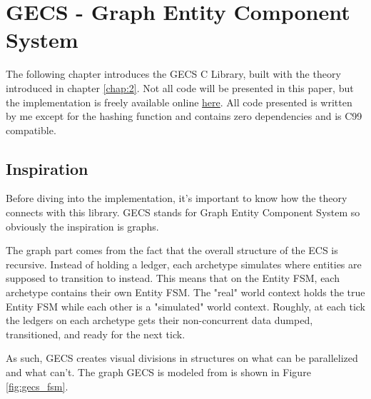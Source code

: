 \section{GECS - Graph Entity Component System}
\label{chap:3}

The following chapter introduces the GECS C Library, built with the theory introduced in chapter \ref{chap:2}. Not all code will be presented in this paper, but the implementation is freely available online \href{https://github.com/EmilChoparinov/GECS}{here}. All code presented is written by me except for the hashing function and contains zero dependencies and is C99 compatible.

\subsection{Inspiration}
Before diving into the implementation, it's important to know how the theory connects with this library. GECS stands for Graph Entity Component System so obviously the inspiration is graphs. 

The graph part comes from the fact that the overall structure of the ECS is recursive. Instead of holding a ledger, each archetype simulates where entities are supposed to transition to instead. This means that on the Entity FSM, each archetype contains their own Entity FSM. The "real" world context holds the true Entity FSM while each other is a "simulated" world context. Roughly, at each tick the ledgers on each archetype gets their non-concurrent data dumped, transitioned, and ready for the next tick.

As such, GECS creates visual divisions in structures on what can be parallelized and what can't. The graph GECS is modeled from is shown in Figure \ref{fig:gecs_fsm}.

